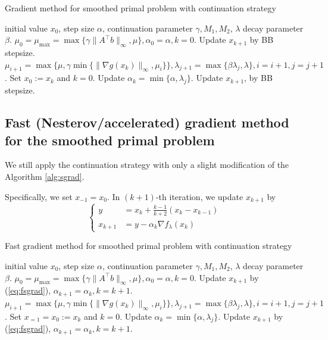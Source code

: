 \documentclass{article}
\numberwithin{equation}{section}
\numberwithin{figure}{section}
\begin{document}
\begin{algorithm}[!htbp]\caption{Gradient method for smoothed primal problem with continuation strategy}\label{alg:sgrad}
\begin{algorithmic}[1]
 initial value $x_0$, step size $\alpha$, continuation parameter $\gamma, M_1, M_2$, $\lambda$ decay parameter $\beta$.
\STATE $\mu_0=\mu_{\max}=\max\{\gamma\|A^\top b\|_\infty,\mu\},\alpha_0=\alpha, k=0$.
\STATE Update $x_{k+1}$ by BB stepsize.
\ENDFOR
\STATE $\mu_{i+1}=\max\{\mu, \gamma\min\{\|\nabla g(x_k)\|_\infty, \mu_i\} \},  \lambda_{j+1}=\max\{\beta\lambda_j,\lambda\}, i = i+1, j = j+1
$.
\STATE Set $x_0 := x_k$ and $k=0$. Update $\alpha_k=\min\{\alpha,\lambda_j\}$.
\ENDWHILE
{}
\STATE Update $x_{k+1}$, by BB stepsize.
\ENDFOR
\end{algorithmic}
\end{algorithm}

\subsection{Fast (Nesterov/accelerated) gradient method for the smoothed primal problem}
We still apply the continuation strategy with only a slight modification of the Algorithm \ref{alg:sgrad}. 

Specifically, we set $x_{-1}=x_0$. In $(k+1)$-th iteration, we update $x_{k+1}$ by
\begin{equation}
    \begin{cases}
    y &= x_k+\frac{k-1}{k+2}(x_k-x_{k-1})\\
    x_{k+1} &=y-\alpha_k\nabla f_{\lambda}(x_k)
    \end{cases}\label{eq:fsgrad}
\end{equation}

\begin{algorithm}[!htbp]\caption{Fast gradient method for smoothed primal problem with continuation strategy}\label{alg:fsgrad}
\begin{algorithmic}[1]
 initial value $x_0$, step size $\alpha$, continuation parameter $\gamma, M_1, M_2$, $\lambda$ decay parameter $\beta$.
\STATE $\mu_0=\mu_{\max}=\max\{\gamma\|A^\top b\|_\infty,\mu\},\alpha_0=\alpha, k=0$.
\STATE Update $x_{k+1}$ by (\ref{eq:fsgrad}), $\alpha_{k+1}=\alpha_k,k=k+1$.
\ENDFOR
\STATE $\mu_{i+1}=\max\{\mu, \gamma\min\{\|\nabla g(x_k)\|_\infty, \mu_i\} \},  \lambda_{j+1}=\max\{\beta\lambda_j,\lambda\}, i = i+1, j = j+1
$.
\STATE Set $x_{=1} = x_0 := x_k$ and $k=0$. Update $\alpha_k=\min\{\alpha,\lambda_j\}$.
\ENDWHILE
{}
\STATE Update $x_{k+1}$ by (\ref{eq:fsgrad}), $\alpha_{k+1}=\alpha_k,k=k+1$.
\ENDFOR
\end{algorithmic}
\end{algorithm}
\end{document}
